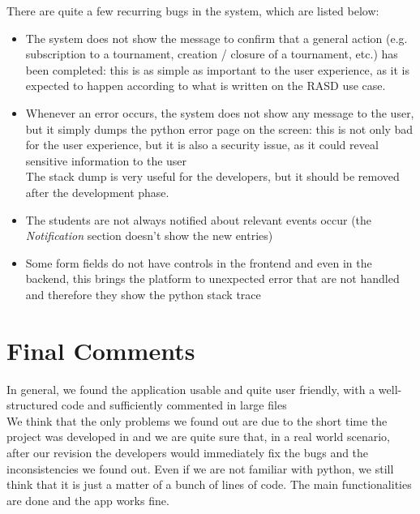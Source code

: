 There are quite a few recurring bugs in the system, which are listed below:
\begin{itemize}
    \item The system does not show the message to confirm that a general action (e.g. subscription to a tournament, creation / closure of a tournament, etc.) has been completed: this is as simple as important to the user experience, as it is expected to happen according to what is written on the RASD use case.
    \item Whenever an error occurs, the system does not show any message to the user, but it simply dumps the python error page on the screen: this is not only bad for the user experience, but it is also a security issue, as it could reveal sensitive information to the user \\ The stack dump is very useful for the developers, but it should be removed after the development phase.
    \item The students are not always notified about relevant events occur (the \textit{Notification} section doesn't show the new entries)
    \item Some form fields do not have controls in the frontend and even in the backend, this brings the platform to unexpected error that are not handled and therefore they show the python stack trace
\end{itemize}

\section{Final Comments}

In general, we found the application usable and quite user friendly, with a well-structured code and sufficiently commented in large files \\

We think that the only problems we found out are due to the short time the project was developed in and we are quite sure that, in a real world scenario, after our revision the developers would immediately fix the bugs and the inconsistencies we found out.
Even if we are not familiar with python, we still think that it is just a matter of a bunch of lines of code. The main functionalities are done and the app works fine.